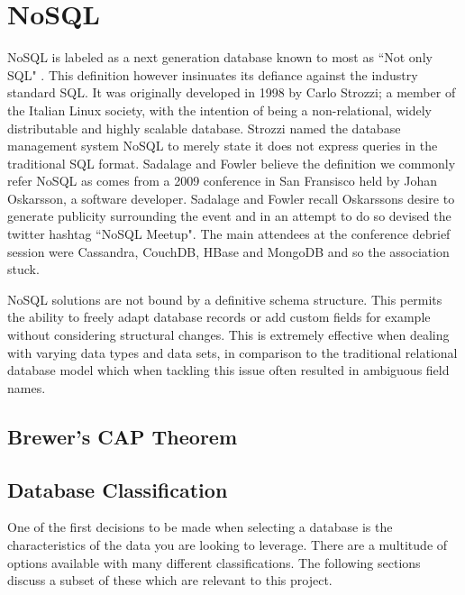 \chapter{NoSQL}\label{nosql}
NoSQL is labeled as a next generation database known to most as ``Not only SQL" \cite{nosql1}. This definition however insinuates its defiance against the industry standard SQL. It was originally developed in 1998 by Carlo Strozzi; a member of the Italian Linux society, with the intention of being a non-relational, widely distributable and highly scalable database. Strozzi named the database management system NoSQL to merely state it does not express queries in the traditional SQL format. Sadalage and Fowler believe the definition we commonly refer NoSQL as comes from a 2009 conference in San Fransisco held by Johan Oskarsson, a software developer. Sadalage and Fowler recall Oskarssons desire to generate publicity surrounding the event and in an attempt to do so devised the twitter hashtag ``NoSQL Meetup". The main attendees at the conference debrief session were Cassandra, CouchDB, HBase and MongoDB and so the association stuck. \cite{nosql1}

NoSQL solutions are not bound by a definitive schema structure. This permits the ability to freely adapt database records or add custom fields for example without considering structural changes. This is extremely effective when dealing with varying data types and data sets, in comparison to the traditional relational database model which when tackling this issue often resulted in ambiguous field names.  \cite{nosql1}

\section{Brewer's CAP Theorem}\label{captheorem}


\section{Database Classification}\label{dbclass}
One of the first decisions to be made when selecting a database is the characteristics of the data you are looking to leverage. \cite{nosql2} There are a multitude of options available with many different classifications. The following sections discuss a subset of these which are relevant to this project.

